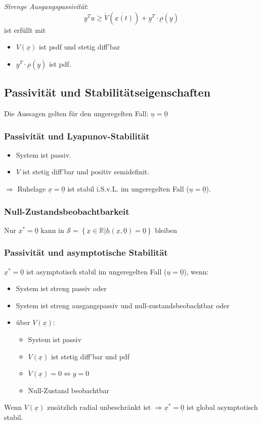 \documentclass[german]{latex4ei/latex4ei_sheet}
\newcommand{\U}{\underline}
\begin{document}
\begin{sectionbox}
\textit{Strenge Ausgangspassivität}:
$$\U{y}^T\U{u} \geq \dot{V}(\dot{\U{x}(t)}) + \U{y}^T \cdot \U{\rho}(\U{y})$$
ist erfüllt mit
\begin{itemize}
	\item $V(\U{x})$ ist psdf und stetig diff'bar 
	\item $\U{y}^T \cdot \U{\rho}(\U{y})$ ist pdf.
\end{itemize}
\end{sectionbox}

\begin{sectionbox}
\subsection{Passivität und Stabilitätseigenschaften}
Die Aussagen gelten für den ungeregelten Fall: $\U{u} = \U{0}$
\subsubsection{Passivität und Lyapunov-Stabilität}
\begin{itemize}
  \item System ist passiv.
  \item $V$ ist stetig diff'bar und positiv semidefinit.
\end{itemize}
$\Rightarrow$ Ruhelage $\U{x}=\U{0}$ ist stabil i.S.v.L. im ungeregelten Fall ($\U{u}=\U{0}$).

\subsubsection{Null-Zustandsbeobachtbarkeit}
Nur $\U{x}^*=\U{0}$ kann in $\mathcal{S} = \left\{ \U{x} \in \mathbb{R} | \U{h}(\U{x},\U{0})=\U{0} \right\}$ bleiben

\subsubsection{Passivität und asymptotische Stabilität} \label{PassStabil}
$\U{x}^*=\U{0}$ ist asymptotisch stabil im ungeregelten Fall ($\U{u}=\U{0}$), wenn:
\begin{itemize}
  \item System ist streng passiv oder 
  \item System ist streng ausgangspassiv und null-zustandsbeobachtbar oder
  \item über $V(\U{x})$:
    \begin{itemize}
      \item System ist passiv
      \item $V(\U{x})$ ist stetig diff'bar und pdf
      \item $\dot{V}(\U{x}) = 0 \Leftrightarrow y = 0$
      \item Null-Zustand beobachtbar
    \end{itemize}
\end{itemize}

Wenn $V(\U{x})$ zusätzlich radial unbeschränkt ist $\Rightarrow \U{x}^* = \U{0}$ ist global asymptotisch stabil.
\end{sectionbox}
\end{document}
